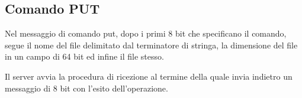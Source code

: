 \subsection{Comando PUT}
Nel messaggio di comando put, dopo i primi 8 bit che specificano il comando, segue il nome del file delimitato dal terminatore di stringa, la dimensione del file in un campo di 64 bit ed infine il file stesso.


Il server avvia la procedura di ricezione al termine della quale invia indietro un messaggio di 8 bit con l'esito dell'operazione.

